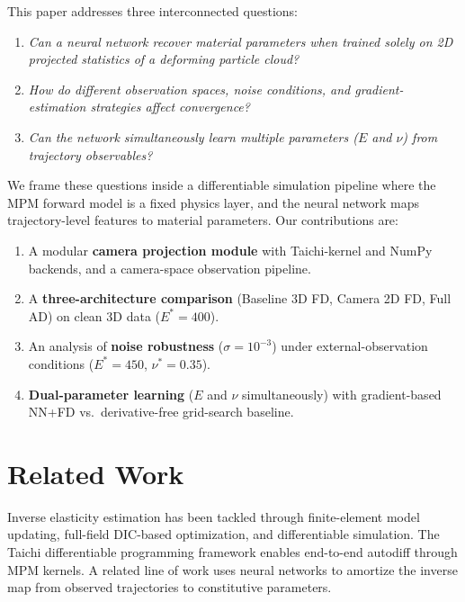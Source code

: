\documentclass{article}
\begin{document}
This paper addresses three interconnected questions:
\begin{enumerate}[itemsep=1pt]
\item \emph{Can a neural network recover material parameters when trained
  solely on 2D projected statistics of a deforming particle cloud?}
\item \emph{How do different observation spaces, noise conditions, and
  gradient-estimation strategies affect convergence?}
\item \emph{Can the network simultaneously learn multiple parameters
  ($E$ and $\nu$) from trajectory observables?}
\end{enumerate}

We frame these questions inside a differentiable simulation pipeline where
the MPM forward model is a fixed physics layer, and the neural network maps
trajectory-level features to material parameters.  Our contributions are:
\begin{enumerate}[itemsep=2pt]
\item A modular \textbf{camera projection module} with Taichi-kernel and
  NumPy backends, and a camera-space observation pipeline.
\item A \textbf{three-architecture comparison} (Baseline 3D FD, Camera 2D FD,
  Full AD) on clean 3D data ($E^*=400$).
\item An analysis of \textbf{noise robustness} ($\sigma=10^{-3}$) under
  external-observation conditions ($E^*=450$, $\nu^*=0.35$).
\item \textbf{Dual-parameter learning} ($E$ and $\nu$ simultaneously) with
  gradient-based NN+FD vs.\ derivative-free grid-search baseline.
\end{enumerate}


\section{Related Work}

Inverse elasticity estimation has been tackled through finite-element model
updating, full-field DIC-based optimization, and differentiable simulation.
The Taichi differentiable programming framework enables end-to-end autodiff
through MPM kernels.  A related line of work uses neural networks to amortize
the inverse map from observed trajectories to constitutive parameters.
\end{document}
